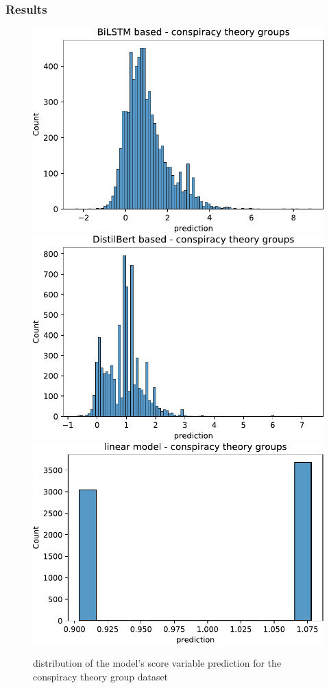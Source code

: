 \documentclass[notes]{tum-presentation}
\begin{document}
\begin{frame}
  \frametitle{Results}
  \begin{figure}[tb]
      \centering
      \includegraphics[width=.33\textwidth]{../report/figures/prediction_groups/bilstm_dist.pdf}
      \includegraphics[width=.32\textwidth]{../report/figures/prediction_groups/distil_bert_dist.pdf}
      \includegraphics[width=.33\textwidth]{../report/figures/prediction_groups/linear_model_prediction_dist.pdf}
      \caption{distribution of the model's score variable prediction for the conspiracy theory group dataset}
      \label{fig:dist-prediction-groups}
  \end{figure}
\end{frame}
\end{document}
